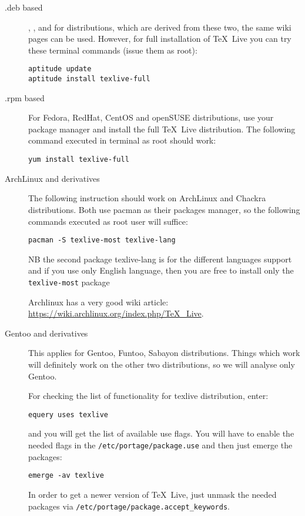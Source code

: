 \begin{description}
    \item[.deb based] 
        ,
        ,
        and for distributions, which are derived from these two, the same wiki
        pages can be used. However, for full installation of \TeX\ Live you can try
        these terminal commands (issue them as root):
\begin{lstlisting}
aptitude update
aptitude install texlive-full
\end{lstlisting}

    \item[.rpm based]
        For Fedora, RedHat, CentOS and openSUSE distributions, use your package
        manager and install the full \TeX\ Live distribution. The following
        command executed in terminal as root should work:
\begin{lstlisting}
yum install texlive-full
\end{lstlisting}

    \item[ArchLinux and derivatives]
        The following instruction should work on ArchLinux and Chackra
        distributions. Both use pacman as their packages manager, so the
        following commands executed as root user will suffice:
\begin{lstlisting}
pacman -S texlive-most texlive-lang
\end{lstlisting}
        NB the second package texlive-lang is for the different languages
        support and if you use only English language, then you are free to
        install only the \verb|texlive-most| package

        Archlinux has a very good wiki article:
        \url{https://wiki.archlinux.org/index.php/TeX_Live}.
        
    \item[Gentoo and derivatives]
        This applies for Gentoo, Funtoo, Sabayon distributions. Things which
        work will definitely work on the other two distributions, so we will
        analyse only Gentoo.

        For checking the list of functionality for texlive distribution, enter:
\begin{lstlisting}
equery uses texlive
\end{lstlisting}
        and you will get the list of available use flags.
        You will have to enable the needed flags in the
        \verb|/etc/portage/package.use| and then just emerge the packages:
\begin{lstlisting}
emerge -av texlive
\end{lstlisting}
        In order to get a newer version of \TeX\ Live, just unmask the needed
        packages via \verb|/etc/portage/package.accept_keywords|.


\end{description}
